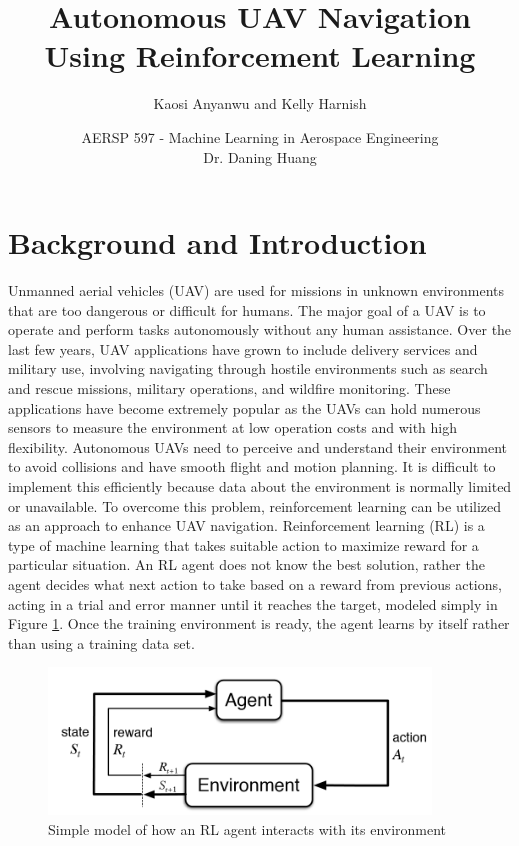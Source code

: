 \documentclass[conf]{new-aiaa}
\title{Autonomous UAV Navigation Using Reinforcement Learning}
\author{Kaosi Anyanwu and Kelly Harnish }
\affil{ ... }
\author{AERSP 597 - Machine Learning in Aerospace Engineering \\ Dr. Daning Huang}
\affil{Pennsylvania State University, State College, PA 16802}
\begin{document}
	
\maketitle

\section{Background and Introduction}

Unmanned aerial vehicles (UAV) are used for missions in unknown environments that are too dangerous or difficult for humans. The major goal of a UAV is to operate and perform tasks autonomously without any human assistance. Over the last few years, UAV applications have grown to include delivery services and military use, involving navigating through hostile environments such as search and rescue missions, military operations, and wildfire monitoring. These applications have become extremely popular as the UAVs can hold numerous sensors to measure the environment at low operation costs and with high flexibility. Autonomous UAVs need to perceive and understand their environment to avoid collisions and have smooth flight and motion planning. It is difficult to implement this efficiently because data about the environment is normally limited or unavailable. To overcome this problem, reinforcement learning can be utilized as an approach to enhance UAV navigation. Reinforcement learning (RL) is a type of machine learning that takes suitable action to maximize reward for a particular situation. An RL agent does not know the best solution, rather the agent decides what next action to take based on a reward from previous actions, acting in a trial and error manner until it reaches the target, modeled simply in Figure \ref{fig:RLmodel}. Once the training environment is ready, the agent learns by itself rather than using a training data set. 

\begin{figure}[!htb]
	\centering\includegraphics[width=4in]{RL_agent}
	\caption{\label{fig:RLmodel} Simple model of how an RL agent interacts with its environment}
\end{figure}
\end{document}
